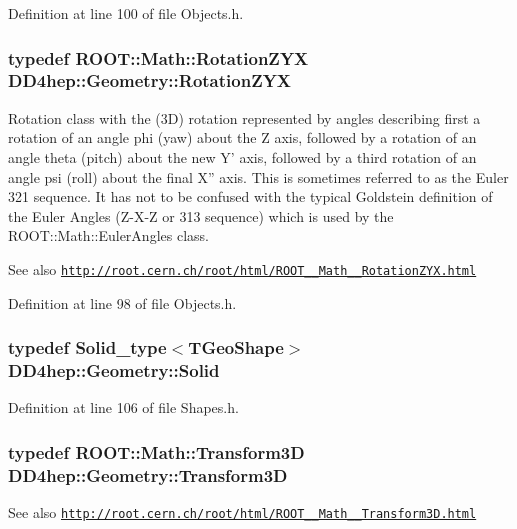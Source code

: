 Definition at line 100 of file Objects.h.\hypertarget{namespace_d_d4hep_1_1_geometry_a24667b2b9c3cec3d5239828db4d52189}{
\subsubsection[{RotationZYX}]{\setlength{\rightskip}{0pt plus 5cm}typedef ROOT::Math::RotationZYX {\bf DD4hep::Geometry::RotationZYX}}}
\label{namespace_d_d4hep_1_1_geometry_a24667b2b9c3cec3d5239828db4d52189}
Rotation class with the (3D) rotation represented by angles describing first a rotation of an angle phi (yaw) about the Z axis, followed by a rotation of an angle theta (pitch) about the new Y' axis, followed by a third rotation of an angle psi (roll) about the final X'' axis. This is sometimes referred to as the Euler 321 sequence. It has not to be confused with the typical Goldstein definition of the Euler Angles (Z-\/X-\/Z or 313 sequence) which is used by the ROOT::Math::EulerAngles class. \begin{DoxySeeAlso}{See also}
\href{http://root.cern.ch/root/html/ROOT__Math__RotationZYX.html}{\tt http://root.cern.ch/root/html/ROOT\_\-\_\-Math\_\-\_\-RotationZYX.html} 
\end{DoxySeeAlso}


Definition at line 98 of file Objects.h.\hypertarget{namespace_d_d4hep_1_1_geometry_a83de90a8dcc7378ba47d54ef9a6a687b}{
\subsubsection[{Solid}]{\setlength{\rightskip}{0pt plus 5cm}typedef {\bf Solid\_\-type}$<$TGeoShape$>$ {\bf DD4hep::Geometry::Solid}}}
\label{namespace_d_d4hep_1_1_geometry_a83de90a8dcc7378ba47d54ef9a6a687b}


Definition at line 106 of file Shapes.h.\hypertarget{namespace_d_d4hep_1_1_geometry_aeb4c0356d12fd7be49a0aae50514e64b}{
\subsubsection[{Transform3D}]{\setlength{\rightskip}{0pt plus 5cm}typedef ROOT::Math::Transform3D {\bf DD4hep::Geometry::Transform3D}}}
\label{namespace_d_d4hep_1_1_geometry_aeb4c0356d12fd7be49a0aae50514e64b}
\begin{DoxySeeAlso}{See also}
\href{http://root.cern.ch/root/html/ROOT__Math__Transform3D.html}{\tt http://root.cern.ch/root/html/ROOT\_\-\_\-Math\_\-\_\-Transform3D.html} 
\end{DoxySeeAlso}


